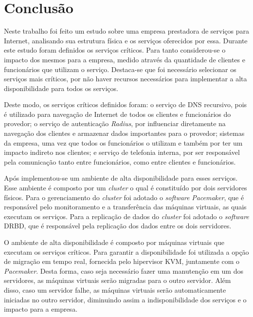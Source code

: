 \chapter{Conclusão}
\label{cap:conclusao}

Neste trabalho foi feito um estudo sobre uma empresa prestadora de serviços para Internet, analisando sua estrutura física e os serviços oferecidos 
por essa. Durante este estudo foram definidos os serviços críticos. Para tanto considerou-se o impacto dos mesmos para a empresa, medido através
da quantidade de clientes e funcionários que utilizam o serviço. Destaca-se que foi necessário selecionar os serviços mais críticos, por não 
haver recursos necessários para implementar a alta disponibilidade para todos os serviços.

Deste modo, os serviços críticos definidos foram: o serviço de \ac{DNS} recursivo, pois é utilizado para navegação de Internet de todos os clientes 
e funcionários do provedor; o serviço de autenticação \textit{Radius}, por influenciar diretamente na navegação dos clientes e armazenar dados 
importantes para o provedor; sistemas da empresa, uma vez que todos os funcionários o utilizam e também por ter um impacto indireto nos 
clientes; e serviço de telefonia interna, por ser responsável pela comunicação tanto entre funcionários, como entre clientes e funcionários.

Após implementou-se um ambiente de alta disponibilidade para esses serviços. Esse ambiente é composto por um \textit{cluster} o qual é constituído 
por dois servidores físicos. Para o gerenciamento do \textit{cluster} foi adotado o \textit{software} \textit{Pacemaker}, que é responsável pelo 
monitoramento e a transferência das máquinas virtuais, as quais executam os serviços. Para a replicação de dados 
do \textit{cluster} foi adotado o \textit{software} \ac{DRBD}, que é responsável pela replicação dos dados entre os dois servidores.

O ambiente de alta disponibilidade é composto por máquinas virtuais que executam os serviços críticos. Para garantir a disponibilidade 
foi utilizada a opção de migração em tempo real, fornecida pelo hipervisor \ac{KVM}, juntamente com o \textit{Pacemaker}. Desta forma, 
caso seja necessário fazer uma manutenção em um dos servidores, as máquinas virtuais serão migradas para o outro servidor.
Além disso, caso um servidor falhe, as máquinas virtuais serão automaticamente iniciadas no outro servidor, diminuindo assim a indisponibilidade
dos serviços e o impacto para a empresa.

